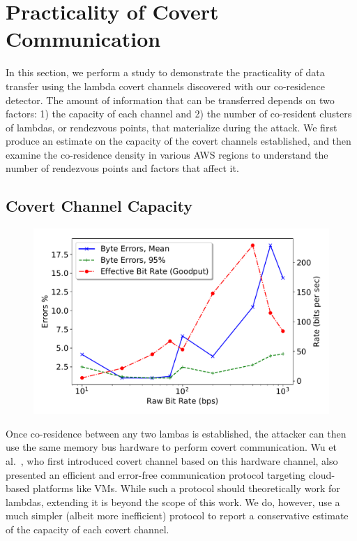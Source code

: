 \section{Practicality of Covert Communication}
\label{sec:study}

In this section, we perform a study to demonstrate the practicality of data 
transfer using the lambda covert channels discovered with our co-residence detector.  
The amount of information that can be transferred depends on two factors: 1) the 
capacity of each channel and 2) the number of co-resident clusters of lambdas, 
or rendezvous points, that materialize during the attack.  We first produce an estimate on the
capacity of the covert channels established, and then examine the co-residence
density in various AWS regions to understand the number of rendezvous points and
factors that affect it.

\subsection{Covert Channel Capacity}

\begin{figure}[!t]
  \includegraphics[width=.99\linewidth]{fig/channel_rate_3gb.pdf}
  \caption{
\label{fig:channel}}
\end{figure}

Once co-residence between any two lambas is established, the attacker can then
use the same memory bus hardware to perform covert communication. Wu et
al.~\cite{wuusenix2012}, who first introduced covert channel based on this
hardware channel, also presented an efficient and error-free communication
protocol targeting cloud-based platforms like VMs.  While such a protocol should
theoretically work for lambdas, extending it is beyond the scope of this work.
We do, however, use a much simpler (albeit more inefficient) protocol to report
a conservative estimate of the capacity of each covert channel.

